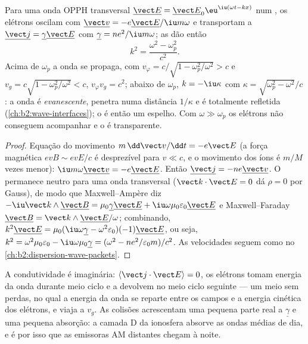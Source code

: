 \begin{theorem}\label{thm:b2:waves-in-media:plasmadispersion}
Para uma onda OPPH transversal $\underline{\vect E} = \underline{\vect E}_0\eu^{\iu(\omega t - kx)}$ num
, os elétrons oscilam com $\underline{\vect v} = -e\underline{\vect E}/\iu m\omega$
e transportam a  $\underline{\vect j} = \underline\gamma\underline{\vect E}$ com
$\underline\gamma = ne^2/\iu m\omega$; as  dão então
\[
k^2 = \frac{\omega^2 - \omega_p^2}{c^2} .
\]
Acima de $\omega_p$ a onda se propaga, com $v_\varphi = c/\sqrt{1 - \omega_p^2/\omega^2}
> c$ e $v_g = c\sqrt{1 - \omega_p^2/\omega^2} < c$, $v_\varphi v_g = c^2$; abaixo de
$\omega_p$, $k = -\iu\kappa$ com $\kappa = \sqrt{\omega_p^2 - \omega^2}/c$: a onda é
\emph{evanescente}, penetra numa distância $1/\kappa$ e é totalmente refletida
(\cref{ch:b2:wave-interfaces}); o  é então um espelho. Com $\omega
\gg \omega_p$ os elétrons não conseguem acompanhar e o  é transparente.
\end{theorem}

\begin{proof}
Equação do movimento $m\,\dd\vect v/\dd t = -e\vect E$ (a força magnética
$ev B \sim evE/c$ é desprezível para $v \ll c$, e o movimento dos íons é
$m/M$ vezes menor): $\iu m\omega\underline{\vect v} = -e\underline{\vect E}$. Então
$\underline{\vect j} = -ne\underline{\vect v}$. O  permanece neutro para uma
onda transversal ($\vect k\cdot\vect E = 0$ dá $\rho = 0$ por Gauss), de modo que
Maxwell--Ampère diz $-\iu\vect k\wedge\underline{\vect B} = \mu_0\underline\gamma\underline{\vect E}
+ \iu\omega\mu_0\varepsilon_0\underline{\vect E}$ e Maxwell--Faraday $\underline{\vect B} = \vect k
\wedge\underline{\vect E}/\omega$; combinando, $k^2\underline{\vect E} = \mu_0(\iu\omega\underline\gamma -
\omega^2\varepsilon_0)(-1)\underline{\vect E}$, ou seja, $k^2 = \omega^2\mu_0\varepsilon_0 - \iu\omega\mu_0
\underline\gamma = (\omega^2 - ne^2/\varepsilon_0m)/c^2$. As velocidades seguem como no
\cref{ch:b2:dispersion-wave-packets}.
\end{proof}

\begin{remark}\label{rem:b2:waves-in-media:plasmaenergy}
A condutividade é imaginária: $\langle\vect j\cdot\vect E\rangle = 0$, os
elétrons tomam energia da onda durante meio ciclo e a devolvem
no meio ciclo seguinte --- um meio sem perdas, no qual a energia da onda
se reparte entre os campos e a energia cinética dos elétrons, e
viaja a $v_g$. As colisões acrescentam uma pequena parte real a $\underline\gamma$ e uma
pequena absorção: a camada D da ionosfera absorve as ondas médias de
dia, e é por isso que as emissoras AM distantes chegam à noite.
\end{remark}

